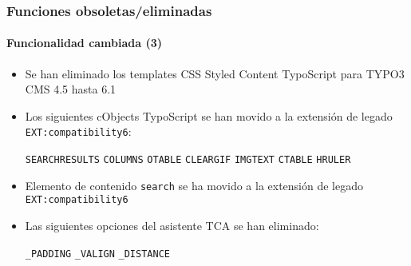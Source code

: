 \begin{frame}[fragile]
	\frametitle{Funciones obsoletas/eliminadas}
	\framesubtitle{Funcionalidad cambiada (3)}

	\begin{itemize}
		\item Se han eliminado los templates CSS Styled Content TypoScript para TYPO3 CMS 4.5 hasta 6.1

		\item Los siguientes cObjects TypoScript se han movido a la extensión de legado
			\texttt{EXT:compatibility6}:

			\vspace{0.2cm}

			\small
				\texttt{SEARCHRESULTS} \tabto{3cm}\texttt{COLUMNS} \tabto{6cm}\texttt{OTABLE} \tabto{9cm}\texttt{CLEARGIF}\newline
				\texttt{IMGTEXT}       \tabto{3cm}\texttt{CTABLE}  \tabto{6cm}\texttt{HRULER}
			\normalsize

		\item Elemento de contenido \texttt{search} se ha movido a la extensión de legado \texttt{EXT:compatibility6}

		\item Las siguientes opciones del asistente TCA se han eliminado:

			\vspace{0.2cm}

			\small
				\texttt{\_PADDING} \tabto{3cm}\texttt{\_VALIGN} \tabto{6cm}\texttt{\_DISTANCE}
			\normalsize

	\end{itemize}

\end{frame}


